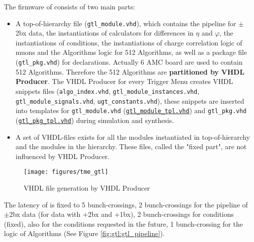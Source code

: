 The firmware of \ugtl consists of two main parts:
\begin{itemize}
\item A top-of-hierarchy file (\texttt{gtl\_module.vhd}), which contains the pipeline for $\pm$2bx data, the instantiations of calculators for differences in $\eta$ and $\varphi$, the instantiations of conditions, the instantiations of charge correlation logic of muons and the Algorithms logic for 512 Algorithms, as well as a package file (\texttt{gtl\_pkg.vhd}) for declarations.
Actually 6 AMC board are used to contain 512 Algorithms. Therefore the 512 Algorithms are \textbf{partitioned by VHDL Producer}.
The VHDL Producer for every Trigger Menu creates VHDL snippets files (\texttt{algo\_index.vhd}, \texttt{gtl\_module\_instances.vhd}, \texttt{gtl\_module\_signals.vhd}, \texttt{ugt\_constants.vhd}), these snippets are inserted into templates for \texttt{gtl\_module.vhd} (\href{https://github.com/cms-l1-globaltrigger/mp7_ugt_legacy/tree/master/firmware/hdl/payload/gtl/gtl_module_tpl.vhd}{\texttt{gtl\_module\_tpl.vhd}}) and \texttt{gtl\_pkg.vhd} (\href{https://github.com/cms-l1-globaltrigger/mp7_ugt_legacy/tree/master/firmware/hdl/packages/gtl_pkg_tpl.vhd}{\texttt{gtl\_pkg\_tpl.vhd}}) during simulation and synthesis.
\item A set of VHDL-files exists for all the modules instantiated in top-of-hierarchy and the modules in the hierarchy. These files, called the "fixed part", are not influenced by VHDL Producer.
\end{itemize}

\begin{figure}[htb]
\centering
\texttt{[image: figures/tme\_gtl]}
\caption{VHDL file generation by VHDL Producer}
\label{fig:gtl:tme_gtl}
\end{figure}

The latency of \ugtl is fixed to 5 bunch-crossings,
2 bunch-crossings for the pipeline of $\pm$2bx data (for data with +2bx and +1bx), 2 bunch-crossings for conditions (fixed), also for the conditions requested in the future, 1 bunch-crossing for the logic of Algorithms (See Figure \ref{fig:gtl:gtl_pipeline}).\\

